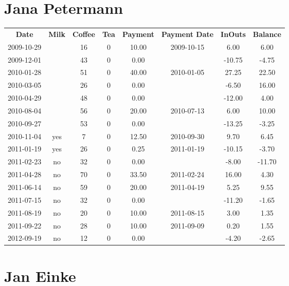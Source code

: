 \section{Jana Petermann}

\begin{center}
\begin{tabular}{cccccccc}
\textbf{Date} & \textbf{Milk} & \textbf{Coffee} & \textbf{Tea} & \textbf{Payment} & \textbf{Payment Date} & \textbf{InOuts} & \textbf{Balance} \\
2009-10-29 &  & 16 & 0 & 10.00 & 2009-10-15 &   6.00 &   6.00\\ 
2009-12-01 &  & 43 & 0 &  0.00 &  & -10.75 &  -4.75\\ 
2010-01-28 &  & 51 & 0 & 40.00 & 2010-01-05 &  27.25 &  22.50\\ 
2010-03-05 &  & 26 & 0 &  0.00 &  &  -6.50 &  16.00\\ 
2010-04-29 &  & 48 & 0 &  0.00 &  & -12.00 &   4.00\\ 
2010-08-04 &  & 56 & 0 & 20.00 & 2010-07-13 &   6.00 &  10.00\\ 
2010-09-27 &  & 53 & 0 &  0.00 &  & -13.25 &  -3.25\\ 
2010-11-04 & yes &  7 & 0 & 12.50 & 2010-09-30 &   9.70 &   6.45\\ 
2011-01-19 & yes & 26 & 0 &  0.25 & 2011-01-19 & -10.15 &  -3.70\\ 
2011-02-23 & no & 32 & 0 &  0.00 &  &  -8.00 & -11.70\\ 
2011-04-28 & no & 70 & 0 & 33.50 & 2011-02-24 &  16.00 &   4.30\\ 
2011-06-14 & no & 59 & 0 & 20.00 & 2011-04-19 &   5.25 &   9.55\\ 
2011-07-15 & no & 32 & 0 &  0.00 &  & -11.20 &  -1.65\\ 
2011-08-19 & no & 20 & 0 & 10.00 & 2011-08-15 &   3.00 &   1.35\\ 
2011-09-22 & no & 28 & 0 & 10.00 & 2011-09-09 &   0.20 &   1.55\\ 
2012-09-19 & no & 12 & 0 &  0.00 &  &  -4.20 &  -2.65
\end{tabular}
\end{center}

\section{Jan Einke}

